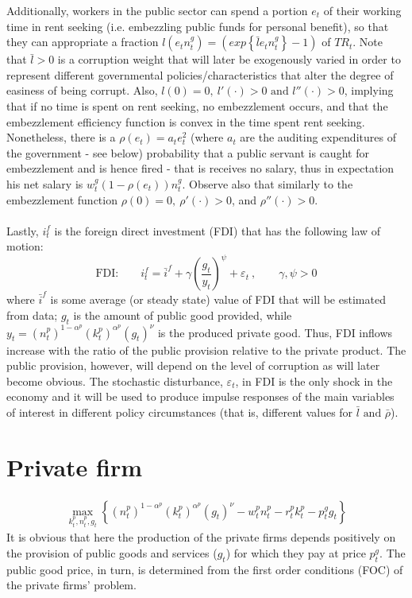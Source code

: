 \documentclass[]{scrartcl}
\begin{document}
Additionally, workers in the public sector can spend a portion $ e_t $ of their working time in rent seeking (i.e. embezzling public funds for personal benefit), so that they can appropriate a fraction $ l(e_tn^g_t)=\left( exp\left\lbrace \bar{l}e_tn^g_t \right\rbrace-1 \right) $ of $ TR_t $. Note that $ \bar{l}>0 $ is a corruption weight that will later be exogenously varied in order to represent different governmental policies/characteristics that alter the degree of easiness of being corrupt. Also, $ l(0)=0,~l'(\cdot)>0\text{ and } l''(\cdot)>0 $, implying that if no time is spent on rent seeking, no embezzlement occurs, and that the embezzlement efficiency function is convex in the time spent rent seeking. Nonetheless, there is a $ \rho(e_t)=a_te_t^2 $ (where $ a_t $ are the auditing expenditures of the government - see below) probability that a public servant is caught for embezzlement and is hence fired - that is receives no salary, thus in expectation his net salary is $ w^g_t (1-\rho(e_t))n^g_t $. Observe also that similarly to the embezzlement function $ \rho(0)=0,~\rho'(\cdot)>0 $, and $ \rho''(\cdot)>0 $. \\\\
Lastly, $ i^f_t $ is the foreign direct investment (FDI) that has the following law of motion:
\begin{equation}
\text{FDI:}\qquad i^f_t=\bar{i}^f+\gamma\left( \frac{g_t}{y_t} \right)^\psi+\varepsilon_t~, \qquad \gamma,\psi>0
\end{equation}
where $ \bar{i}^f $ is some average (or steady state) value of FDI that will be estimated from data; $ g_t $ is the amount of public good provided, while $ y_t=(n_t^p)^{1-\alpha^p}(k_t^p)^{\alpha^p}(g_t)^\nu $ is the produced private good. Thus, FDI inflows increase with the ratio of the public provision relative to the private product. The public provision, however, will depend on the level of corruption as will later become obvious. The stochastic disturbance, $ \varepsilon_t $, in FDI is the only shock in the economy and it will be used to produce impulse responses of the main variables of interest in different policy circumstances (that is, different values for $ \bar{l}\text{ and } \bar{\rho} $).

\section{Private firm}
\begin{align}
\max_{k_t^p,n_t^p,g_t}\left\lbrace (n_t^p)^{1-\alpha^p}(k_t^p)^{\alpha^p}(g_t)^\nu-w^p_tn^p_t-r^p_tk_t^p-p^g_tg_t \right\rbrace
\end{align}
It is obvious that here the production of the private firms depends positively on the provision of public goods and services ($ g_t $) for which they pay at price $ p_t^g $. The public good price, in turn, is determined from the first order conditions (FOC) of the private firms' problem.
\end{document}
